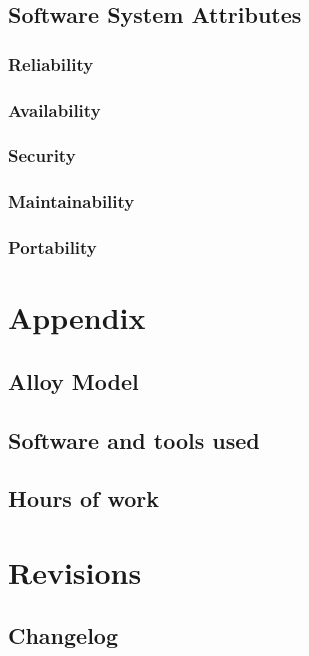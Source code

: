 \documentclass[english]{article}
\begin{document}
\subsection{Software System Attributes}

\subsubsection{Reliability}

\subsubsection{Availability}

\subsubsection{Security}

\subsubsection{Maintainability}

\subsubsection{Portability}

\newpage{}

\section{Appendix}

\subsection{Alloy Model}

\subsection{Software and tools used}

\subsection{Hours of work}

\newpage{}

\section{Revisions}

\subsection{Changelog}
\end{document}
